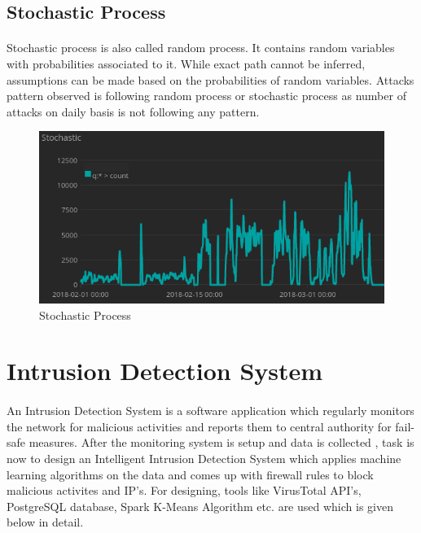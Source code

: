\documentclass{article}
\begin{document}
\subsection{Stochastic Process}
\paragraph{}
Stochastic process is also called random process. It contains random variables with probabilities associated to it. While exact path cannot be inferred, assumptions can be made based on the probabilities of random variables. Attacks pattern observed is following random process or stochastic process as number of attacks on daily basis is not following any pattern.

\begin{figure}[H]
\centering
\caption{Stochastic Process}
\includegraphics[scale=0.7]{Stochastic_Process}
\end{figure}

\section{Intrusion Detection System}
\paragraph{}
An Intrusion Detection System is a software application which regularly monitors the network for malicious activities and reports them to central authority for fail-safe measures. After the monitoring system is setup and data is collected , task is now to design an Intelligent Intrusion Detection System which applies machine learning algorithms on the data and comes up with firewall rules to block malicious activites and IP's. For designing, tools like VirusTotal API's, PostgreSQL database, Spark K-Means Algorithm etc. are used which is given below in detail.
\end{document}
